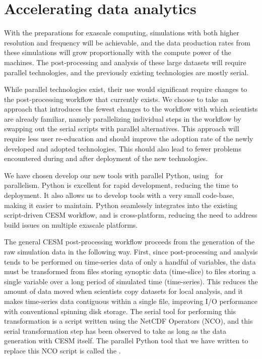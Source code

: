 \section{Accelerating data analytics }\label{sec:postproc}

With the preparations for exascale computing, simulations with both higher resolution and frequency will be achievable, and the data production rates from these simulations will grow proportionally with the compute power of the machines.  The post-processing and analysis of these large datasets will require parallel technologies, and the previously existing technologies are mostly serial.  

While parallel technologies exist, their use would significant require changes to the post-processing workflow that currently exists.  We choose to take an approach that introduces the fewest changes to the workflow with which scientists are already familiar, namely parallelizing individual steps in the workflow by swapping out the serial scripts with parallel alternatives.  This approach will require less user re-education and should improve the adoption rate of the newly developed and adopted technologies.  This should also lead to fewer problems encountered during and after deployment of the new technologies.

We have chosen develop our new tools with parallel Python, using \mpipy\ for parallelism.  Python is excellent for rapid development, reducing the time to deployment.  It also allows us to develop tools with a very small code-base, making it easier to maintain.  Python seamlessly integrates into the existing script-driven CESM workflow, and is cross-platform, reducing the need to address build issues on multiple exascale platforms.

The general CESM post-processing workflow proceeds from the generation of the raw simulation data in the following way.  First, since post-processing and analysis tends to be performed on time-series data of only a handful of variables, the data must be transformed from files storing synoptic data (time-slice) to files storing a single variable over a long period of simulated time (time-series).  This reduces the amount of data moved when scientists copy datasets for local analysis, and it makes time-series data contiguous within a single file, improving I/O performance with conventional spinning disk storage.  The serial tool for performing this transformation is a script written using the NetCDF Operators (NCO), and this serial transformation step has been observed to take as long as the data generation with CESM itself.  The parallel Python tool that we have written to replace this NCO script is called the \pyreshaper.

